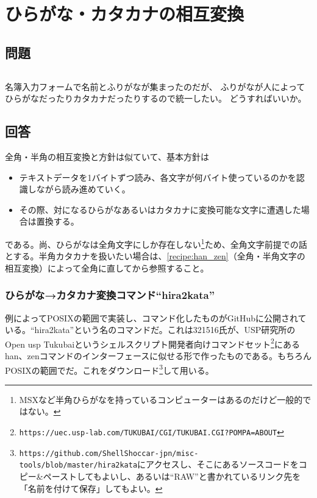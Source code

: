 \section{ひらがな・カタカナの相互変換}
\label{recipe:hira_kata}

\subsection*{問題}
\noindent
$\!\!\!\!\!$
\begin{grshfboxit}{160.0mm}
	名簿入力フォームで名前とふりがなが集まったのだが、
	ふりがなが人によってひらがなだったりカタカナだったりするので統一したい。
	どうすればいいか。
\end{grshfboxit}

\subsection*{回答}
全角・半角の相互変換と方針は似ていて、基本方針は
\begin{itemize}
  \item テキストデータを1バイトずつ読み、各文字が何バイト使っているのかを認識しながら読み進めていく。
  \item その際、対になるひらがなあるいはカタカナに変換可能な文字に遭遇した場合は置換する。
\end{itemize}
である。尚、ひらがなは全角文字にしか存在しない\footnote{MSXなど半角ひらがなを持っているコンピューターはあるのだけど一般的ではない。}ため、全角文字前提での話とする。半角カタカナを扱いたい場合は、\ref{recipe:han_zen}（全角・半角文字の相互変換）によって全角に直してから参照すること。

\subsubsection*{ひらがな→カタカナ変換コマンド``hira2kata''}

例によってPOSIXの範囲で実装し、コマンド化したものがGitHubに公開されている。``hira2kata''という名のコマンドだ。これは321516氏が、USP研究所のOpen usp Tukubaiというシェルスクリプト開発者向けコマンドセット\footnote{\verb|https://uec.usp-lab.com/TUKUBAI/CGI/TUKUBAI.CGI?POMPA=ABOUT|}にあるhan、zenコマンドのインターフェースに似せる形で作ったものである。もちろんPOSIXの範囲でだ。これをダウンロード\footnote{\verb|https://github.com/ShellShoccar-jpn/misc-tools/blob/master/hira2kata|にアクセスし、そこにあるソースコードをコピー\&{}ペーストしてもよいし、あるいは``RAW''と書かれているリンク先を「名前を付けて保存」してもよい。}して用いる。

